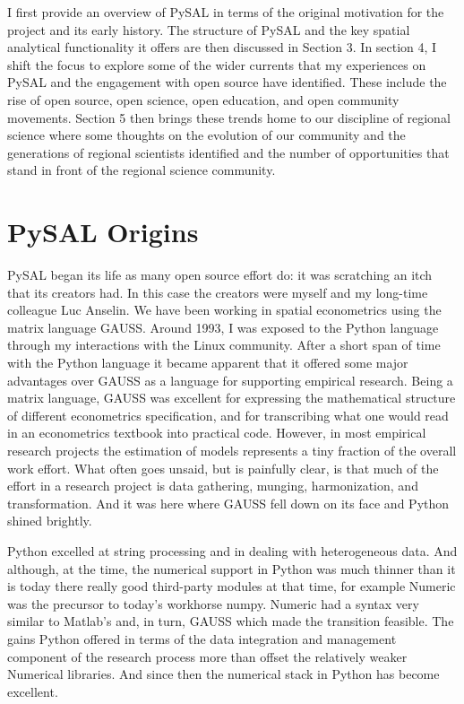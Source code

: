 \documentclass[11pt]{article}
\begin{document}
I first provide an overview of PySAL in terms of the original motivation for
the project and its early history. The structure of PySAL and the key spatial
analytical functionality it offers are then discussed in Section 3. In section
4, I shift the focus to explore some of the wider currents that my experiences
on PySAL and the engagement with open source have identified. These include the
rise of open source, open science, open education, and open community
movements. Section 5 then brings these trends home to our discipline of
regional science where some thoughts on the evolution of our community and the
generations of regional scientists identified and the number of opportunities
that stand in front of the regional science community.

\section*{PySAL Origins}
\label{sec:org5c752ab}
PySAL began its life as many open source effort do: it was scratching
an itch that its creators had. In this case the creators were myself and my
long-time colleague Luc Anselin. We have been working in spatial econometrics
using the matrix language GAUSS. Around 1993, I was exposed to the Python
language through my interactions with the Linux community. After a short span of
time with the Python language it became apparent that it offered some major
advantages over GAUSS as a language for supporting empirical research. Being a
matrix language, GAUSS was excellent for expressing the mathematical structure
of different econometrics specification, and for transcribing what one would
read in an econometrics textbook into practical code. However, in most empirical
research projects the estimation of models represents a tiny fraction of the
overall work effort. What often goes unsaid, but is painfully clear, is that
much of the effort in a research project is data gathering, munging,
harmonization, and transformation. And it was here where GAUSS fell down on its
face and Python shined brightly.

Python excelled at string processing and in dealing with heterogeneous data.
And although, at the time, the numerical support in Python was much thinner
than it is today there really good third-party modules at that time, for
example Numeric was the precursor to today's workhorse numpy. Numeric had a
syntax very similar to Matlab's and, in turn, GAUSS which made the transition
feasible. The gains Python offered in terms of the data integration and management
component of the research process more than offset the relatively weaker
Numerical libraries. And since then the numerical stack in Python has become
excellent.
\end{document}
